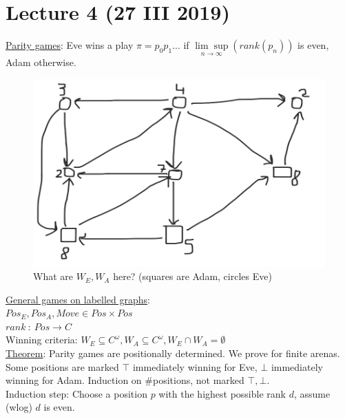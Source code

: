 \section{Lecture 4 (27 III 2019)}
\underline{Parity games}:
Eve wins a play $\pi = p_0p_1...$ if $\underset{n \rightarrow \infty}{\lim\sup} (rank(p_n))$ is even,
Adam otherwise.\\
\begin{figure}[H]
	\centering
	\caption{What are $W_E, W_A$ here? (squares are Adam, circles Eve)}
	\includegraphics[scale=0.15]{content/graphics/game4}
\end{figure}
\noindent
\underline{General games on labelled graphs}:\\
$Pos_E, Pos_A, Move \in Pos \times Pos$\\
$rank\ :\ Pos \longrightarrow C$\\
Winning criteria:
$W_E \subseteq C^{\omega}, W_A \subseteq C^{\omega}, W_E \cap W_A = \emptyset$\\
\underline{Theorem}: Parity games are positionally determined. We prove for finite
arenas. Some positions are marked $\top$ immediately winning for Eve, $\bot$ immediately winning for Adam.
Induction on \#positions, not marked $\top, \bot$.\\
Induction step: Choose a position $p$ with the highest possible rank $d$, assume (wlog) $d$ is even.
